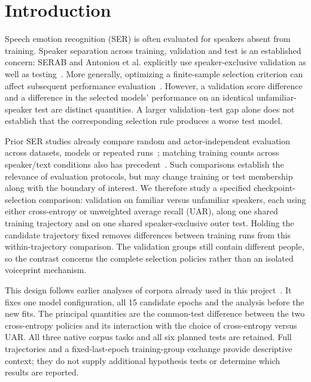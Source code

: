 \section{Introduction}
Speech emotion recognition (SER) is often evaluated for speakers absent from training. Speaker separation across training, validation and test is an established concern: SERAB and Antoniou et al. explicitly use speaker-exclusive validation as well as testing~\cite{serab,antoniou}. More generally, optimizing a finite-sample selection criterion can affect subsequent performance evaluation~\cite{cawley}. However, a validation score difference and a difference in the selected models' performance on an identical unfamiliar-speaker test are distinct quantities. A larger validation--test gap alone does not establish that the corresponding selection rule produces a worse test model.

Prior SER studies already compare random and actor-independent evaluation across datasets, models or repeated runs~\cite{ibrahim,zielonka,kumari}; matching training counts across speaker/text conditions also has precedent~\cite{atmaja}. Such comparisons establish the relevance of evaluation protocols, but may change training or test membership along with the boundary of interest. We therefore study a specified checkpoint-selection comparison: validation on familiar versus unfamiliar speakers, each using either cross-entropy or unweighted average recall (UAR), along one shared training trajectory and on one shared speaker-exclusive outer test. Holding the candidate trajectory fixed removes differences between training runs from this within-trajectory comparison. The validation groups still contain different people, so the contrast concerns the complete selection policies rather than an isolated voiceprint mechanism.

This design follows earlier analyses of corpora already used in this project~\cite{artifact}. It fixes one model configuration, all 15 candidate epochs and the analysis before the new fits. The principal quantities are the common-test difference between the two cross-entropy policies and its interaction with the choice of cross-entropy versus UAR. All three native corpus tasks and all six planned tests are retained. Full trajectories and a fixed-last-epoch training-group exchange provide descriptive context; they do not supply additional hypothesis tests or determine which results are reported.


